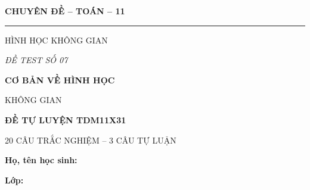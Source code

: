 \documentclass[12pt,a4paper]{article}
\begin{document}
\noindent
\begin{minipage}[t]{.35\textwidth}
  \centering
  {\bfseries CHUYÊN ĐỀ -- TOÁN -- 11\par}
  \vspace{2pt}\rule{.72\linewidth}{.4pt}\par\vspace{3pt}
  HÌNH HỌC KHÔNG GIAN\par\vspace{4pt}
  {\itshape ĐỀ TEST SỐ 07\par}
\end{minipage}\hfill
\begin{minipage}[t]{.62\textwidth}
  \centering
  {\bfseries CƠ BẢN VỀ HÌNH HỌC\par
  KHÔNG GIAN\par}
  \vspace{5pt}
  {\small\bfseries ĐỀ TỰ LUYỆN TDM11X31\par
  20 CÂU TRẮC NGHIỆM -- 3 CÂU TỰ LUẬN\par}
\end{minipage}
\vspace{6mm}
\noindent
\begin{minipage}[t]{.72\textwidth}
  \textbf{Họ, tên học sinh:}\dotfill\par
  \vspace{3pt}
  \textbf{Lớp:}\dotfill
\end{minipage}\hfill
\begin{minipage}[t]{.25\textwidth}
  \raggedleft\setlength{\fboxsep}{4pt}
\end{minipage}
\end{document}
